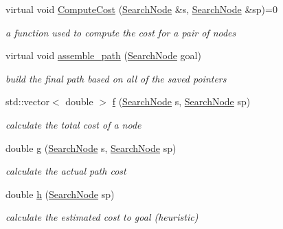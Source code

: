 \begin{DoxyCompactItemize}
\item 
virtual void \hyperlink{classhsearch_1_1HSearch_a5d325955c4faedaca0c68155fd1f7e69}{Compute\+Cost} (\hyperlink{structhsearch_1_1SearchNode}{Search\+Node} \&s, \hyperlink{structhsearch_1_1SearchNode}{Search\+Node} \&sp)=0
\begin{DoxyCompactList}\small\item\em a function used to compute the cost for a pair of nodes \end{DoxyCompactList}\item 
virtual void \hyperlink{classhsearch_1_1HSearch_ac94c08c0f0d4cc3076f01d70c6cd7679}{assemble\+\_\+path} (\hyperlink{structhsearch_1_1SearchNode}{Search\+Node} goal)
\begin{DoxyCompactList}\small\item\em build the final path based on all of the saved pointers \end{DoxyCompactList}\item 
std\+::vector$<$ double $>$ \hyperlink{classhsearch_1_1HSearch_a6ca884af67da489fa1b20592abc1dbba}{f} (\hyperlink{structhsearch_1_1SearchNode}{Search\+Node} s, \hyperlink{structhsearch_1_1SearchNode}{Search\+Node} sp)
\begin{DoxyCompactList}\small\item\em calculate the total cost of a node \end{DoxyCompactList}\item 
double \hyperlink{classhsearch_1_1HSearch_a687960c8dcfc61e16613a72a4ff1c14d}{g} (\hyperlink{structhsearch_1_1SearchNode}{Search\+Node} s, \hyperlink{structhsearch_1_1SearchNode}{Search\+Node} sp)
\begin{DoxyCompactList}\small\item\em calculate the actual path cost \end{DoxyCompactList}\item 
double \hyperlink{classhsearch_1_1HSearch_aa09bc55605f454f822892a40e580b164}{h} (\hyperlink{structhsearch_1_1SearchNode}{Search\+Node} sp)
\begin{DoxyCompactList}\small\item\em calculate the estimated cost to goal (heuristic) \end{DoxyCompactList}\end{DoxyCompactItemize}
